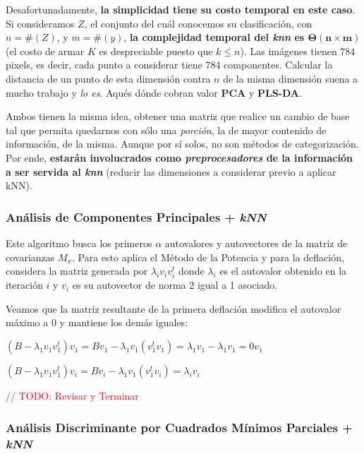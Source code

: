 Desafortunadamente, \textbf{la simplicidad tiene su costo temporal en este caso}. Si consideramos $Z$, el conjunto del cu\'al conocemos su clasificaci\'on, con $n = \#(Z)$, y $m = \#(y)$, \textbf{la complejidad temporal del \textit{knn} es $\mathbf{\Theta(n \times m)}$} (el costo de armar $K$ es despreciable puesto que $k \leq n$). Las im\'agenes tienen $784$ pixels, es decir, cada punto a considerar tiene $784$ componentes. Calcular la distancia de un punto de esta dimensi\'on contra \textit{$n$} de la misma dimensi\'on suena a mucho trabajo y \textit{lo es}. Aqu\' es d\'onde cobran valor \textbf{PCA} y \textbf{PLS-DA}.

Ambos tienen la misma idea, obtener una matriz que realice un cambio de base tal que permita quedarnos con s\'olo una \textit{porci\'on}, la de mayor contenido de informaci\'on, de la misma. Aunque por s\'i solos, no son m\'etodos de categorizaci\'on. Por ende, \textbf{estar\'an involucrados como \textit{preprocesadores} de la informaci\'on a ser servida al \textit{knn}} (reducir las dimensiones a considerar previo a aplicar kNN).

\subsubsection{An\'alisis de Componentes Principales + \textit{kNN}}

Este algoritmo busca los primeros $\alpha$ autovalores y autovectores de la matriz de covarianzas $M_{x}$. Para esto aplica el M\'etodo de la Potencia y para la deflaci\'on, considera la matriz generada por $\lambda_{i}v_{i}v_{i}^{t}$ donde $\lambda_{i}$ es el autovalor obtenido en la iteraci\'on $i$ y $v_{i}$ es su autovector de norma 2 igual a 1 asociado.

Veamos que la matriz resultante de la primera deflaci\'on modifica el autovalor m\'aximo a 0 y mantiene los dem\'as iguales:

$(B - \lambda_{1}v_{1}v_{1}^{t})v_{1} = Bv_{1} - \lambda_{1}v_{1}(v_{1}^{t}v_{1}) = \lambda_{1}v_{1} - \lambda_{1}v_{1} = 0v_{1}$

$(B - \lambda_{1}v_{1}v_{1}^{t})v_{i} = Bv_{i} - \lambda_{1}v_{1}(v_{1}^{t}v_{i}) = \lambda_{i}v_{i}$

\textcolor{red}{// TODO: Revisar y Terminar}

\subsubsection{An\'alisis Discriminante por Cuadrados M\'inimos Parciales + \textit{kNN}}

